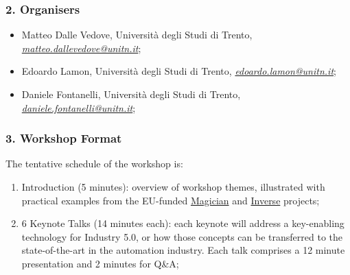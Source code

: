 \documentclass{article}
\newcommand{\email}[1]{\href{mailto:#1}{\itshape #1}}
\begin{document}
\subsubsection*{2. Organisers}
\begin{itemize}
    \item Matteo Dalle Vedove, Università degli Studi di Trento, \email{matteo.dallevedove@unitn.it};
    \item Edoardo Lamon, Università degli Studi di Trento, \email{edoardo.lamon@unitn.it};
    \item Daniele Fontanelli, Università degli Studi di Trento, \email{daniele.fontanelli@unitn.it};
\end{itemize}

\subsubsection*{3. Workshop Format}
% 

The tentative schedule of the workshop is:
\begin{enumerate}
    \item Introduction (5 minutes): overview of workshop themes, illustrated with practical examples from the EU-funded \href{https://www.magician-project.eu/}{Magician} and \href{https://www.inverse-project.org/}{Inverse} projects;
    \item 6 Keynote Talks (14 minutes each): each keynote will address a key-enabling technology for Industry 5.0, or how those concepts can be transferred to the state-of-the-art in the automation industry. Each talk comprises a 12 minute presentation and 2 minutes for Q\&A;
\end{enumerate}
\end{document}
